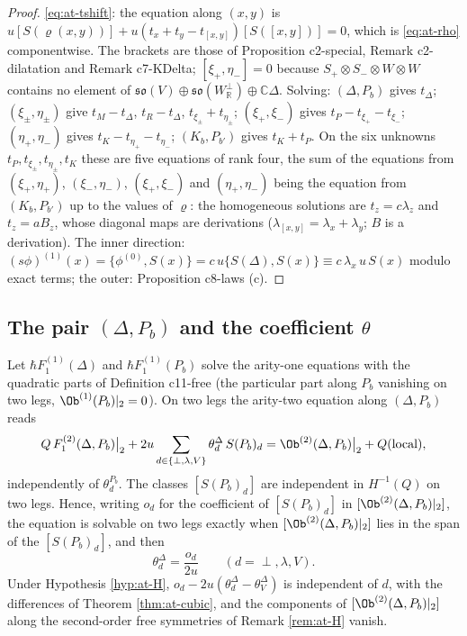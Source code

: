 \begin{proof}
\eqref{eq:at-tshift}: the equation along $(x,y)$ is $u[S(\varrho(x,y))]+u(t_x+t_y-t_{[x,y]})[S([x,y])]=0$, which is \eqref{eq:at-rho} componentwise. The brackets are those of Proposition c2-special, Remark c2-dilatation and Remark c7-KDelta; $[\xi_+,\eta_-]=0$ because $S_+\otimes S_-\otimes W\otimes W$ contains no element of $\mathfrak{so}(V)\oplus\mathfrak{so}(W^\perp_{\mathbb R})\oplus\mathbb C\Delta$. Solving: $(\Delta,P_b)$ gives $t_\Delta$; $(\xi_\pm,\eta_\pm)$ give $t_M-t_\Delta$, $t_R-t_\Delta$, $t_{\xi_\pm}+t_{\eta_\pm}$; $(\xi_+,\xi_-)$ gives $t_P-t_{\xi_+}-t_{\xi_-}$; $(\eta_+,\eta_-)$ gives $t_K-t_{\eta_+}-t_{\eta_-}$; $(K_b,P_{b'})$ gives $t_K+t_P$. On the six unknowns $t_P,t_{\xi_\pm},t_{\eta_\pm},t_K$ these are five equations of rank four, the sum of the equations from $(\xi_+,\eta_+)$, $(\xi_-,\eta_-)$, $(\xi_+,\xi_-)$ and $(\eta_+,\eta_-)$ being the equation from $(K_b,P_{b'})$ up to the values of $\varrho$: the homogeneous solutions are $t_z=c\lambda_z$ and $t_z=aB_z$, whose diagonal maps are derivations ($\lambda_{[x,y]}=\lambda_x+\lambda_y$; $B$ is a derivation). The inner direction: $(s\phi)^{(1)}(x)=\{\phi^{(0)},S(x)\}=c\,u\{S(\Delta),S(x)\}\equiv c\,\lambda_x\,u\,S(x)$ modulo exact terms; the outer: Proposition c8-laws (c).
\end{proof}

\subsection{The pair $(\Delta,P_b)$ and the coefficient $\theta$}

\begin{theorem}
\label{thm:at-theta}
Let $\hbar F_1^{(1)}(\Delta)$ and $\hbar F_1^{(1)}(P_b)$ solve the arity-one equations with the quadratic parts of Definition c11-free (the particular part along $P_b$ vanishing on two legs, $\Ob^{(1)}(P_b)|_2=0$). On two legs the arity-two equation along $(\Delta,P_b)$ reads
\begin{equation}
Q\,F_1^{(2)}(\Delta,P_b)\big|_2+2u\sum_{d\in\{\perp,\lambda,V\}}\theta^\Delta_d\,S(P_b)_d=\Ob^{(2)}(\Delta,P_b)\big|_2+Q(\text{local}),
\label{eq:at-theta}
\end{equation}
independently of $\theta^{P_b}_d$. The classes $[S(P_b)_d]$ are independent in $H^{-1}(Q)$ on two legs. Hence, writing $o_d$ for the coefficient of $[S(P_b)_d]$ in $[\Ob^{(2)}(\Delta,P_b)|_2]$, the equation is solvable on two legs exactly when $[\Ob^{(2)}(\Delta,P_b)|_2]$ lies in the span of the $[S(P_b)_d]$, and then
\[
\theta^\Delta_d=\frac{o_d}{2u}\qquad(d=\perp,\lambda,V).
\]
Under Hypothesis \ref{hyp:at-H}, $o_d-2u(\theta^\Delta_d-\theta^\Delta_V)$ is independent of $d$, with the differences of Theorem \ref{thm:at-cubic}, and the components of $[\Ob^{(2)}(\Delta,P_b)|_2]$ along the second-order free symmetries of Remark \ref{rem:at-H} vanish.
\end{theorem}


